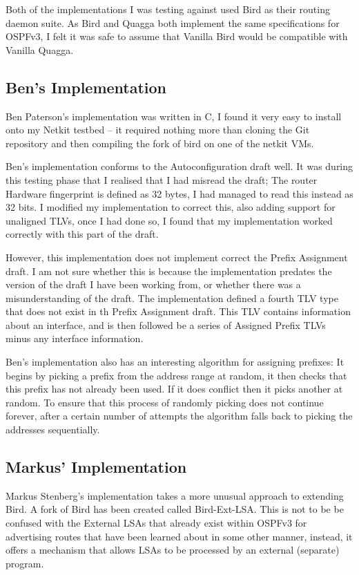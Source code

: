 \documentclass[12pt]{report}
\begin{document}
Both of the implementations I was testing against used Bird as their routing
daemon suite. As Bird and Quagga both implement the same specifications for
OSPFv3, I felt it was safe to assume that Vanilla Bird would be compatible with
Vanilla Quagga. 

\subsection{Ben's Implementation}
Ben Paterson's implementation was written in C, I found it very easy to install onto my
Netkit testbed -- it required nothing more than cloning the Git repository and
then compiling the fork of bird on one of the netkit VMs. 

Ben's implementation conforms to the Autoconfiguration draft well. It was
during this testing phase that I realised that I had misread the draft; The
router Hardware fingerprint is defined as 32 bytes, I had managed to read this
instead as 32 bits. I modified my implementation to correct this, also adding
support for unaligned TLVs, once I had done so, I found that my implementation
worked correctly with this part of the draft.

However, this implementation does not implement correct the Prefix Assignment
draft. I am not sure whether this is because the implementation predates the
version of the draft I have been working from, or whether there was a
misunderstanding of the draft. The implementation defined a fourth TLV type
that does not exist in th Prefix Assignment draft. This TLV contains information
about an interface, and is then followed be a series of Assigned Prefix TLVs
minus any interface information. 

Ben's implementation also has an interesting algorithm for assigning prefixes:
It begins by picking a prefix from the address range at random, it then checks
that this prefix has not already been used. If it does conflict then it picks
another at random. To ensure that this process of randomly picking does not
continue forever, after a certain number of attempts the algorithm falls back
to picking the addresses sequentially. 

\subsection{Markus' Implementation}
Markus Stenberg's implementation takes a more unusual approach to extending
Bird. A fork of Bird has been created called Bird-Ext-LSA\@. This is not to be
be confused with the External LSAs that already exist within OSPFv3 for
advertising routes that have been learned about in some other manner, instead,
it offers a mechanism that allows LSAs to be processed by an external
(separate) program. 
\end{document}
